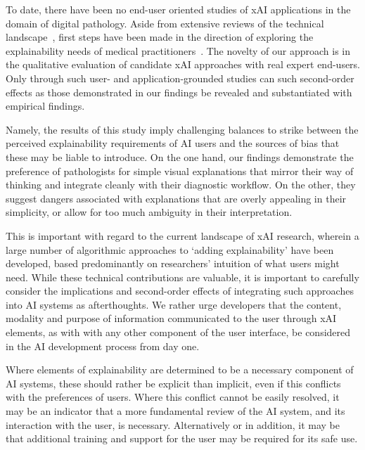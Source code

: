 To date, there have been no end-user oriented studies of xAI applications in the domain of digital pathology. Aside from extensive reviews of the technical landscape~\cite{yang2021unbox, poceviciute_survey_2020}, first steps have been made in the direction of exploring the explainability needs of medical practitioners~\cite{liao2020questioning,cai2019hello,wang_designing_2019}. The novelty of our approach is in the qualitative evaluation of candidate xAI approaches with real expert end-users. Only through such user- and application-grounded studies can such second-order effects as those demonstrated in our findings be revealed and substantiated with empirical findings.

Namely, the results of this study imply challenging balances to strike between the perceived explainability requirements of AI users and the sources of bias that these may be liable to introduce. On the one hand, our findings demonstrate the preference of pathologists for simple visual explanations that mirror their way of thinking and integrate cleanly with their diagnostic workflow. On the other, they suggest dangers associated with explanations that are overly appealing in their simplicity, or allow for too much ambiguity in their interpretation. 

This is important with regard to the current landscape of xAI research, wherein a large number of algorithmic approaches to `adding explainability' have been developed, based predominantly on researchers' intuition of what users might need. While these technical contributions are valuable, it is important to carefully consider the implications and second-order effects of integrating such approaches into AI systems as afterthoughts. We rather urge developers that the content, modality and purpose of information communicated to the user through xAI elements, as with with any other component of the user interface, be considered in the AI development process from day one.

Where elements of explainability are determined to be a necessary component of AI systems, these should rather be explicit than implicit, even if this conflicts with the preferences of users. Where this conflict cannot be easily resolved, it may be an indicator that a more fundamental review of the AI system, and its interaction with the user, is necessary. Alternatively or in addition, it may be that additional training and support for the user may be required for its safe use. 


